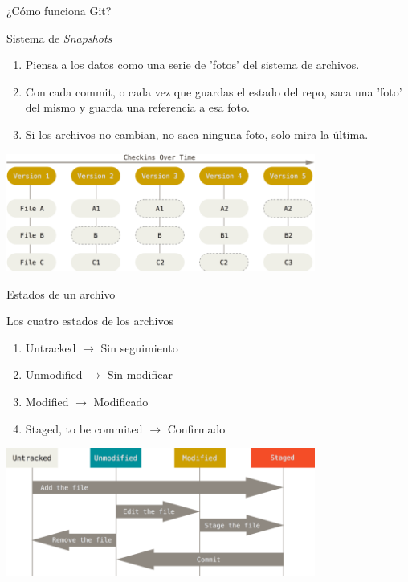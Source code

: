 \documentclass{beamer}
\begin{document}
\begin{frame}[t]{¿Cómo funciona Git?}
    \begin{center}
        \begin{block}{Sistema de \textit{Snapshots}}
        \begin{enumerate}
            \item Piensa a los datos como una serie de 'fotos' del sistema de archivos.
            \item Con cada commit, o cada vez que guardas el estado del repo, saca una 'foto' del mismo y guarda una referencia a esa foto.
            \item Si los archivos no cambian, no saca ninguna foto, solo mira la última.
            
        \end{enumerate}

        \end{block}

        \includegraphics[width=4in]{images/snapshots.png}
    \end{center}
    
\end{frame}

\begin{frame}{Estados de un archivo}

    \begin{block}{Los cuatro estados de los archivos}
            \begin{enumerate}
    \item Untracked $\xrightarrow{}$ Sin seguimiento
    \item Unmodified $\xrightarrow{}$ Sin modificar
    \item Modified $\xrightarrow{}$ Modificado
    \item Staged, to be commited $\xrightarrow{}$ Confirmado
    \end{enumerate}
    \end{block}
    \begin{center}
        \includegraphics[width=4in]{images/lifecycle.png}
    \end{center}
    
    
\end{frame}
\end{document}
